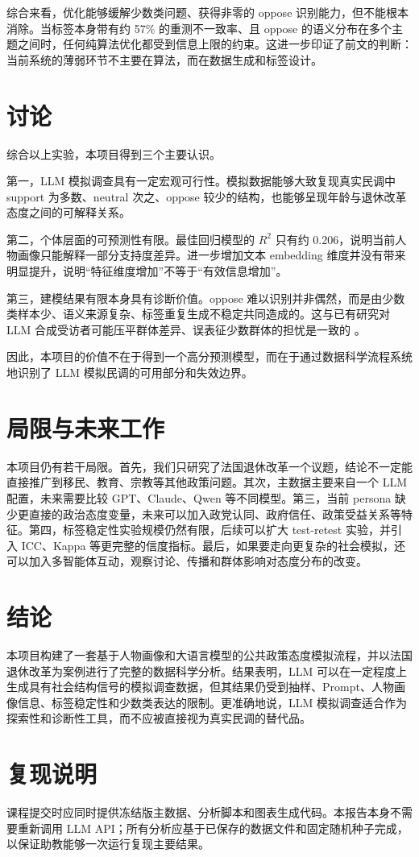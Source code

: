 \documentclass[11pt,a4paper]{ctexart}
\begin{document}
综合来看，优化能够缓解少数类问题、获得非零的 oppose 识别能力，但不能根本消除。当标签本身带有约 57\% 的重测不一致率、且 oppose 的语义分布在多个主题之间时，任何纯算法优化都受到信息上限的约束。这进一步印证了前文的判断：当前系统的薄弱环节不主要在算法，而在数据生成和标签设计。

\section{讨论}
综合以上实验，本项目得到三个主要认识。

第一，LLM 模拟调查具有一定宏观可行性。模拟数据能够大致复现真实民调中 support 为多数、neutral 次之、oppose 较少的结构，也能够呈现年龄与退休改革态度之间的可解释关系。

第二，个体层面的可预测性有限。最佳回归模型的 $R^2$ 只有约 0.206，说明当前人物画像只能解释一部分支持度差异。进一步增加文本 embedding 维度并没有带来明显提升，说明“特征维度增加”不等于“有效信息增加”。

第三，建模结果有限本身具有诊断价值。oppose 难以识别并非偶然，而是由少数类样本少、语义来源复杂、标签重复生成不稳定共同造成的。这与已有研究对 LLM 合成受访者可能压平群体差异、误表征少数群体的担忧是一致的 \cite{wang2024replace,cheng2023marked}。

因此，本项目的价值不在于得到一个高分预测模型，而在于通过数据科学流程系统地识别了 LLM 模拟民调的可用部分和失效边界。

\section{局限与未来工作}
本项目仍有若干局限。首先，我们只研究了法国退休改革一个议题，结论不一定能直接推广到移民、教育、宗教等其他政策问题。其次，主数据主要来自一个 LLM 配置，未来需要比较 GPT、Claude、Qwen 等不同模型。第三，当前 persona 缺少更直接的政治态度变量，未来可以加入政党认同、政府信任、政策受益关系等特征。第四，标签稳定性实验规模仍然有限，后续可以扩大 test-retest 实验，并引入 ICC、Kappa 等更完整的信度指标。最后，如果要走向更复杂的社会模拟，还可以加入多智能体互动，观察讨论、传播和群体影响对态度分布的改变。

\section{结论}
本项目构建了一套基于人物画像和大语言模型的公共政策态度模拟流程，并以法国退休改革为案例进行了完整的数据科学分析。结果表明，LLM 可以在一定程度上生成具有社会结构信号的模拟调查数据，但其结果仍受到抽样、Prompt、人物画像信息、标签稳定性和少数类表达的限制。更准确地说，LLM 模拟调查适合作为探索性和诊断性工具，而不应被直接视为真实民调的替代品。

\section*{复现说明}
课程提交时应同时提供冻结版主数据、分析脚本和图表生成代码。本报告本身不需要重新调用 LLM API；所有分析应基于已保存的数据文件和固定随机种子完成，以保证助教能够一次运行复现主要结果。



\end{document}
